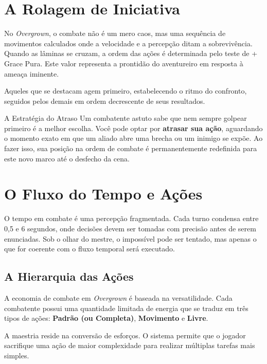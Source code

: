 
\section*{A Rolagem de Iniciativa}

No \textit{Overgrown}, o combate não é um mero caos, mas uma sequência de movimentos calculados onde a velocidade e a percepção ditam a sobrevivência. Quando as lâminas se cruzam, a ordem das ações é determinada pelo teste de  + Grace Pura. Este valor representa a prontidão do aventureiro em resposta à ameaça iminente.

Aqueles que se destacam agem primeiro, estabelecendo o ritmo do confronto, seguidos pelos demais em ordem decrescente de seus resultados.

\begin{rpgboxtips}{A Estratégia do Atraso}
Um combatente astuto sabe que nem sempre golpear primeiro é a melhor escolha. Você pode optar por \textbf{atrasar sua ação}, aguardando o momento exato em que um aliado abre uma brecha ou um inimigo se expõe. Ao fazer isso, sua posição na ordem de combate é permanentemente redefinida para este novo marco até o desfecho da cena.
\end{rpgboxtips}

\section*{O Fluxo do Tempo e Ações}

O tempo em combate é uma percepção fragmentada. Cada turno condensa entre 0,5 e 6 segundos, onde decisões devem ser tomadas com precisão antes de serem enunciadas. Sob o olhar do mestre, o impossível pode ser tentado, mas apenas o que for coerente com o fluxo temporal será executado.

\subsection*{A Hierarquia das Ações}

A economia de combate em \textit{Overgrown} é baseada na versatilidade. Cada combatente possui uma quantidade limitada de energia que se traduz em três tipos de ações: \textbf{Padrão (ou Completa)}, \textbf{Movimento} e \textbf{Livre}. 

A maestria reside na conversão de esforços. O sistema permite que o jogador sacrifique uma ação de maior complexidade para realizar múltiplas tarefas mais simples.

